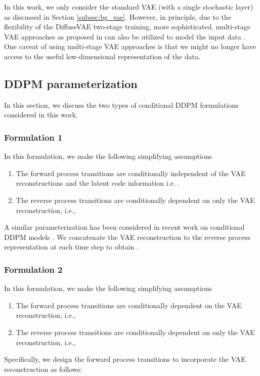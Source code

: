 \documentclass[10pt]{article} \usepackage[accepted]{tmlr}
\begin{document}
In this work, we only consider the standard VAE (with a single stochastic layer) as discussed in Section \ref{subsec:bg_vae}. However, in principle, due to the flexibility of the DiffuseVAE two-stage training, more sophisticated, multi-stage VAE approaches as proposed in \citep{razavi2019generating, child2021deep, vahdat2021nvae} can also be utilized to model the input data . One caveat of using multi-stage VAE approaches is that we might no longer have access to the useful low-dimensional representation of the data.

\subsection{DDPM parameterization}

In this section, we discuss the two types of conditional DDPM formulations considered in this work.
\subsubsection{Formulation 1}
\label{subsec:form1}
In this formulation, we make the following simplifying assumptions
\begin{enumerate}
    \item The forward process transitions are conditionally independent of the VAE reconstructions  and the latent code information  i.e. .
    \item The reverse process transitions are conditionally dependent on only the VAE reconstruction, i.e., 
\end{enumerate}
A similar parameterization has been considered in recent work on conditional DDPM models \citep{ho2021cascaded, saharia2021image}. We concatenate the VAE reconstruction to the reverse process representation  at each time step  to obtain .

\subsubsection{Formulation 2}
\label{subsec:form2}
In this formulation, we make the following simplifying assumptions
\begin{enumerate}
    \item The forward process transitions are conditionally dependent on the VAE reconstruction, i.e., 
    \item The reverse process transitions are conditionally dependent on only the VAE reconstruction, i.e., 
\end{enumerate}
Specifically, we design the forward process transitions to incorporate the VAE reconstruction  as follows:
\end{document}
